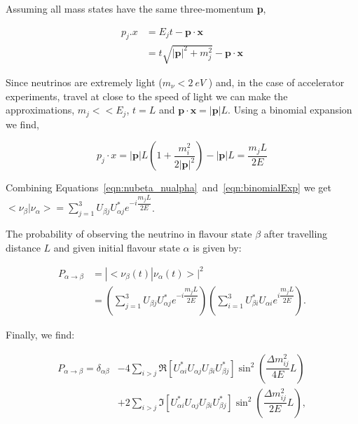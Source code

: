 Assuming all mass states have the same three-momentum \textbf{p}, 

\begin{equation}
  \begin{split}
    p_j.x & = E_jt - \textbf{p} \cdot \textbf{x} \\
    & =t\sqrt{|\textbf{p}|^2 + m_j^2} - \textbf{p} \cdot \textbf{x}
  \end{split}
\end{equation}

Since neutrinos are extremely light ($m_{\nu} < 2~eV$ \cite{pdg}) and,
in the case of accelerator experiments, travel at close to the speed
of light we can make the approximations, $m_j << E_j$, $t = L$ and $
\textbf{p} \cdot \textbf{x} = |\textbf{p}|L$. Using a binomial
expansion we find,  

\begin{equation}
p_j \cdot x = |\textbf{p}|L\left( 1 + \dfrac{m_i^2}{2|\textbf{p}|^2 }
\right) - |\textbf{p}|L  = \dfrac{m_jL}{2E}
 \label{eqn:binomialExp}
\end{equation}


Combining Equations~\ref{eqn:nubeta_nualpha}~and~\ref{eqn:binomialExp}
we get $<\nu_{\beta}|\nu_{\alpha}> = \sum_{j=1}^{3}U_{\beta j}
U^{*}_{\alpha j} e^{-i\dfrac{m_jL}{2E}}$. 

The probability of observing the neutrino in flavour state $\beta$
after travelling distance $L$ and given initial flavour state $\alpha$
is given by: 

\begin{equation}
\begin{split}
P_{\alpha \rightarrow \beta} & = |<\nu_{\beta}\left(t\right) |
\nu_{\alpha}\left(t\right)>|^2\\ 
& = \left( \sum_{j=1}^{3}U_{\beta j}   U^{*}_{\alpha j}
  e^{-i\dfrac{m_jL}{2E}}\right) 
\left(\sum_{i=1}^{3}U^*_{\beta i}   U_{\alpha i}
  e^{i\dfrac{m_jL}{2E}}\right). 
\end{split}
\end{equation}

Finally, we find:

\begin{equation}
\begin{split}
P_{\alpha \rightarrow \beta} = \delta_{\alpha \beta}  
&- 4 \sum_{i>j}\mathfrak{R}[U^*_{\alpha i} U_{\alpha j} U_{\beta i}
U^*_{\beta j}] \sin^2\left(\dfrac{\Delta m^2_{ij}}{4E} L\right)\\ 
&+ 2 \sum_{i>j}\mathfrak{I}[U^*_{\alpha i} U_{\alpha j} U_{\beta i}
U^*_{\beta j}] \sin^2\left(\dfrac{\Delta m^2_{ij}}{2E} L\right), 
\end{split}
\label{eqn:genTransProb}
\end{equation}


